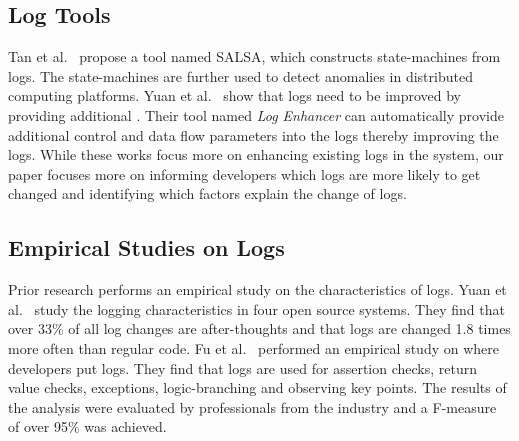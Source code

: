 %
%
\subsection {Log Tools}

Tan {et al}$ . $~\cite{TanSalsa} propose a tool named SALSA, which constructs state-machines from logs. The state-machines are further used to detect anomalies in distributed computing platforms. Yuan {et al$ . $}~\cite{Yuan} show that logs need to be improved by providing additional . Their tool named \emph{Log Enhancer} can automatically provide additional control and data flow parameters into the logs thereby improving the logs. While these works focus more on enhancing existing logs in the system, our paper focuses more on informing developers which logs are more likely to get changed and identifying which factors explain the change of logs. 




\subsection{Empirical Studies on Logs}


Prior research performs an empirical study on the characteristics of logs. Yuan {et al}$ . $~\cite{Characterizinglogs} study the logging characteristics in four open source systems. They find that over 33\% of all log changes are after-thoughts and that logs are changed 1.8 times more often than regular code. Fu {et al$.$}~\cite{Fu1} performed an empirical study on where developers put logs. They find that logs are used for assertion checks, return value checks, exceptions, logic-branching and observing key points. The results of the analysis were evaluated by professionals from the industry and a F-measure of over 95\% was achieved. 


